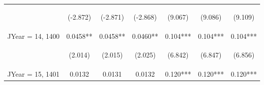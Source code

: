 \documentclass[]{article}
\begin{document}
\begin{center}
\begin{tabular}{lcccccc}
        \vspace{4pt}     & \begin{footnotesize}(-2.872)\end{footnotesize} & \begin{footnotesize}(-2.871)\end{footnotesize} & \begin{footnotesize}(-2.868)\end{footnotesize} & \begin{footnotesize}(9.067)\end{footnotesize}  & \begin{footnotesize}(9.086)\end{footnotesize}  & \begin{footnotesize}(9.109)\end{footnotesize}  \\
        JYear = 14, 1400 & 0.0458**                                       & 0.0458**                                       & 0.0460**                                       & 0.104***                                       & 0.104***                                       & 0.104***                                       \\
        \vspace{4pt}     & \begin{footnotesize}(2.014)\end{footnotesize}  & \begin{footnotesize}(2.015)\end{footnotesize}  & \begin{footnotesize}(2.025)\end{footnotesize}  & \begin{footnotesize}(6.842)\end{footnotesize}  & \begin{footnotesize}(6.847)\end{footnotesize}  & \begin{footnotesize}(6.856)\end{footnotesize}  \\
        JYear = 15, 1401 & 0.0132                                         & 0.0131                                         & 0.0132                                         & 0.120***                                       & 0.120***                                       & 0.120***                                       \\

\end{tabular}
\end{center}
\end{document}
